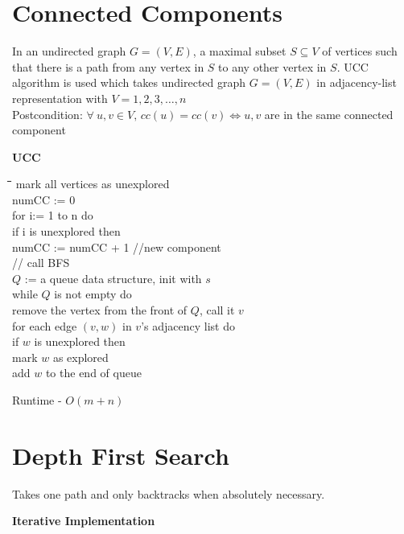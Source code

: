 \documentclass{article}
\begin{document}
	\section{Connected Components}
	In an undirected graph $G = (V,E)$, a maximal subset $S \subseteq V$  of vertices such that there is a path from any vertex in $S$ to any other vertex in $S$.
	UCC algorithm is used which takes undirected graph $G = (V,E)$ in adjacency-list representation with $V = {1, 2, 3, \ldots, n}$ \\
	Postcondition: $\forall \: u,v \in V, \, cc(u) = cc(v) \iff u,v$ are in the same connected component
	\begin{center}
		\begin{large}
			\textbf{UCC}
		\end{large}
	\end{center}
		\begin{tabbing}
		\qquad \= \qquad \= \qquad \= \qquad \= \qquad \= \kill
		mark all vertices as unexplored \\
		numCC := 0 \\
		for i:= 1 to n do \\
		\> if i is unexplored then \\
		\> \> numCC := numCC + 1 //new component \\
		\> \> // call BFS \\
		\> \> $Q$ := a queue data structure, init with $s$ \\
		\> \> while $Q$ is not empty do \\
		\> \> \> remove the vertex from the front of $Q$, call it $v$ \\
		\> \> \> for each edge $(v,w)$ in $v$'s adjacency list do \\
		\> \> \> \> if $w$ is unexplored then \\
		\> \> \> \> \> mark $w$ as explored \\
		\> \> \>  \> \> add $w$ to the end of queue
	\end{tabbing} Runtime - $O(m+n)$
	
	\section{Depth First Search}
	Takes one path and only backtracks when absolutely necessary.
	
	\begin{center}
		\begin{large}
			\textbf{Iterative Implementation}
		\end{large}
	\end{center}
	
\end{document}
